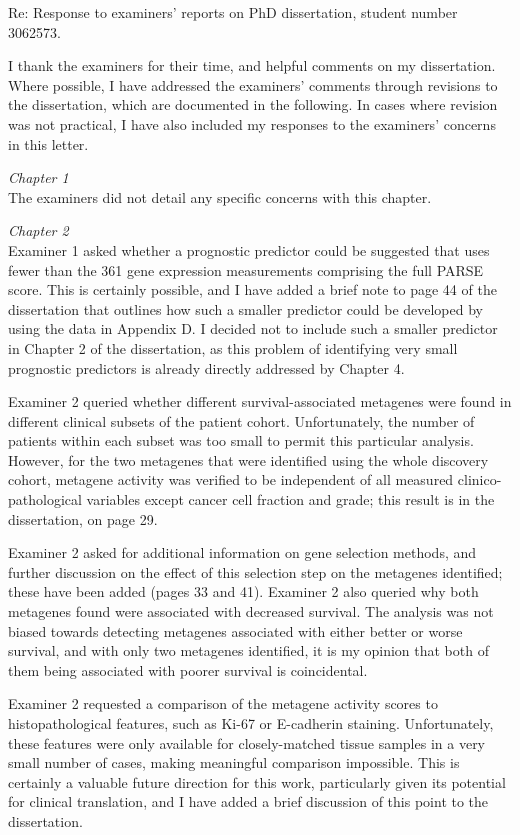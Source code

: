 \documentclass[a4paper,12pt,stdletter,sigleft]{newlfm}
\begin{document}
\begin{newlfm}

Re: Response to examiners' reports on PhD dissertation, student number 3062573.

I thank the examiners for their time, and helpful comments on my dissertation.  Where possible, I have addressed the examiners' comments through revisions to the dissertation, which are documented in the following.  In cases where revision was not practical, I have also included my responses to the examiners' concerns in this letter.

\emph{Chapter 1} \\
The examiners did not detail any specific concerns with this chapter.

\emph{Chapter 2} \\
Examiner 1 asked whether a prognostic predictor could be suggested that uses fewer than the 361 gene expression measurements comprising the full PARSE score.  This is certainly possible, and I have added a brief note to page 44 of the dissertation that outlines how such a smaller predictor could be developed by using the data in Appendix D.  I decided not to include such a smaller predictor in Chapter 2 of the dissertation, as this problem of identifying very small prognostic predictors is already directly addressed by Chapter 4.

Examiner 2 queried whether different survival-associated metagenes were found in different clinical subsets of the patient cohort.  Unfortunately, the number of patients within each subset was too small to permit this particular analysis.  However, for the two metagenes that were identified using the whole discovery cohort, metagene activity was verified to be independent of all measured clinico-pathological variables except cancer cell fraction and grade; this result is in the dissertation, on page 29.

Examiner 2 asked for additional information on gene selection methods, and further discussion on the effect of this selection step on the metagenes identified; these have been added (pages 33 and 41).  Examiner 2 also queried why both metagenes found were associated with decreased survival.  The analysis was not biased towards detecting metagenes associated with either better or worse survival, and with only two metagenes identified, it is my opinion that both of them being associated with poorer survival is coincidental.

Examiner 2 requested a comparison of the metagene activity scores to histopathological features, such as Ki-67 or E-cadherin staining.  Unfortunately, these features were only available for closely-matched tissue samples in a very small number of cases, making meaningful comparison impossible.  This is certainly a valuable future direction for this work, particularly given its potential for clinical translation, and I have added a brief discussion of this point to the dissertation.


\end{newlfm}
\end{document}
